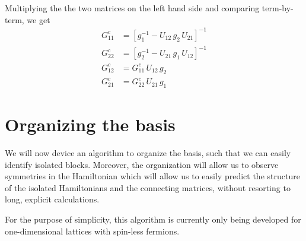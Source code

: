 	Multiplying the the two matrices on the left hand side and comparing term-by-term, we get
	\begin{align}
		G^{c}_{11} &= \left[ g^{-1}_{1} - U_{12}\,g_2\,U_{21}  \right]^{-1}\\
		G^{c}_{22} &= \left[ g^{-1}_{2} - U_{21}\,g_1\,U_{12}  \right]^{-1}\\
		G^{c}_{12} &= G^{c}_{11}\,U_{12}\,g_2\\
		G^{c}_{21} &= G^{c}_{22}\,U_{21}\,g_1
	\end{align}

\section{Organizing the basis}
	We will now device an algorithm to organize the basis, such that we can easily identify isolated blocks. Moreover, the organization will allow us to observe symmetries in the Hamiltonian which will allow us to easily predict the structure of the isolated Hamiltonians and the connecting matrices, without resorting to long, explicit calculations.
	
	For the purpose of simplicity, this algorithm is currently only being developed for one-dimensional lattices with spin-less fermions.